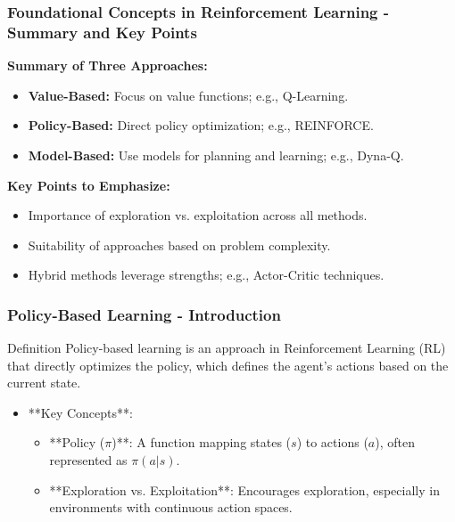 \documentclass[aspectratio=169]{beamer}
\begin{document}
\begin{frame}[fragile]
    \frametitle{Foundational Concepts in Reinforcement Learning - Summary and Key Points}
    \textbf{Summary of Three Approaches:}
    
    \begin{itemize}
        \item \textbf{Value-Based:} Focus on value functions; e.g., Q-Learning.
        \item \textbf{Policy-Based:} Direct policy optimization; e.g., REINFORCE.
        \item \textbf{Model-Based:} Use models for planning and learning; e.g., Dyna-Q.
    \end{itemize}
    
    \textbf{Key Points to Emphasize:}
    
    \begin{itemize}
        \item Importance of exploration vs. exploitation across all methods.
        \item Suitability of approaches based on problem complexity.
        \item Hybrid methods leverage strengths; e.g., Actor-Critic techniques.
    \end{itemize}
\end{frame}

\begin{frame}[fragile]
    \frametitle{Policy-Based Learning - Introduction}
    \begin{block}{Definition}
        Policy-based learning is an approach in Reinforcement Learning (RL) that directly optimizes the policy, which defines the agent's actions based on the current state. 
    \end{block}  

    \begin{itemize}
        \item **Key Concepts**:
        \begin{itemize}
            \item **Policy ($\pi$)**: A function mapping states ($s$) to actions ($a$), often represented as $\pi(a|s)$.
            \item **Exploration vs. Exploitation**: Encourages exploration, especially in environments with continuous action spaces.
        \end{itemize}
    \end{itemize}
\end{frame}
\end{document}
